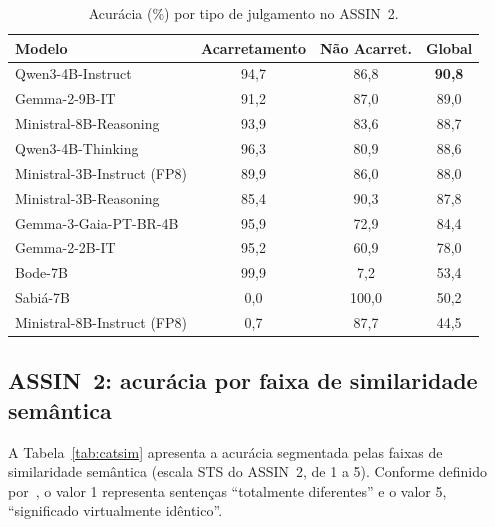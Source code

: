 \documentclass[12pt]{article}
\begin{document}
\begin{table}[ht]
\centering
\caption{Acurácia (\%) por tipo de julgamento no ASSIN~2.}
\label{tab:assin2}
\begin{tabular}{lccc}
\toprule
\textbf{Modelo} & \textbf{Acarretamento} & \textbf{Não Acarret.} & \textbf{Global} \\
\midrule
Qwen3-4B-Instruct            & 94,7 & 86,8  & \textbf{90,8} \\
Gemma-2-9B-IT                & 91,2 & 87,0  & 89,0 \\
Ministral-8B-Reasoning       & 93,9 & 83,6  & 88,7 \\
Qwen3-4B-Thinking            & 96,3 & 80,9  & 88,6 \\
Ministral-3B-Instruct (FP8)  & 89,9 & 86,0  & 88,0 \\
Ministral-3B-Reasoning       & 85,4 & 90,3  & 87,8 \\
Gemma-3-Gaia-PT-BR-4B        & 95,9 & 72,9  & 84,4 \\
Gemma-2-2B-IT                & 95,2 & 60,9  & 78,0 \\
Bode-7B                      & 99,9 & 7,2   & 53,4 \\
Sabiá-7B                     & 0,0  & 100,0 & 50,2 \\
Ministral-8B-Instruct (FP8)  & 0,7  & 87,7  & 44,5 \\
\bottomrule
\end{tabular}
\end{table}

\subsection{ASSIN~2: acurácia por faixa de similaridade semântica}

A Tabela~\ref{tab:catsim} apresenta a acurácia segmentada pelas faixas de
similaridade semântica (escala STS do ASSIN~2, de 1 a 5). Conforme definido
por~\cite{real2020assin}, o valor 1 representa sentenças ``totalmente
diferentes'' e o valor 5, ``significado virtualmente idêntico''.
\end{document}
